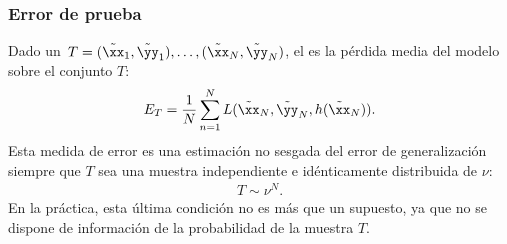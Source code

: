 %
\subsubsection{Error de prueba}
%
Dado un 
$\,T=(\tilde{\xx}_1,\tilde{\yy}_1),\ldots,(\tilde{\xx}_N,\tilde{\yy}_N)$,
el  es la pérdida media del modelo sobre el
conjunto $T$:
%
\begin{align}
  E_T=\frac{1}{N}\sum_{n=1}^N
  L(\tilde{\xx}_N,\tilde{\yy}_N,h(\tilde{\xx}_N)).
  \label{eq:error-prueba}
\end{align}
%
Esta medida de error es una estimación no sesgada del error de
generalización siempre que $T$ sea una muestra independiente e
idénticamente distribuida de $\nu$:
%
\begin{align}
  T\sim\nu^N.
  \label{eq:conj-prueba-sim-nu}
\end{align}
%
En la práctica, esta última condición no es más que un supuesto, ya
que no se dispone de información de la probabilidad de la muestra $T$.
